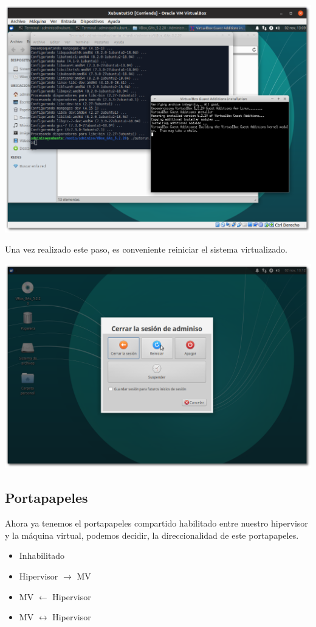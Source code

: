\documentclass[11pt]{article}
\begin{document}
\begin{center}
\includegraphics[width=.9\linewidth]{imgs/VBox_GuestAdd_LinuX_023.png}
\end{center}

Una vez realizado este paso, es conveniente reiniciar el sistema
virtualizado.

\begin{center}
\includegraphics[width=.9\linewidth]{imgs/VBox_GuestAdd_LinuX_026.png}
\end{center}

\subsection{Portapapeles}
\label{sec:org177130d}
Ahora ya tenemos el portapapeles compartido habilitado entre nuestro
hipervisor y la máquina virtual, podemos decidir, la direccionalidad de
este portapapeles.

\begin{itemize}
\item Inhabilitado
\item Hipervisor \(\rightarrow\) MV
\item MV \(\leftarrow\) Hipervisor
\item MV \(\leftrightarrow\) Hipervisor
\end{itemize}
\end{document}
